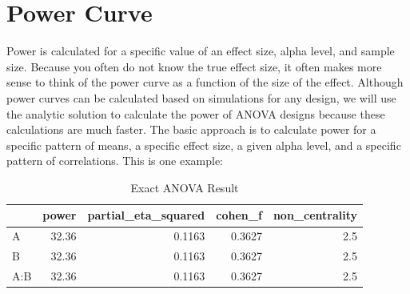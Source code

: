 \documentclass[]{book}
\newenvironment{Shaded}{\begin{snugshade}}{\end{snugshade}}
\newcommand{\CommentTok}[1]{\textcolor[rgb]{0.56,0.35,0.01}{\textit{#1}}}
\newcommand{\DataTypeTok}[1]{\textcolor[rgb]{0.13,0.29,0.53}{#1}}
\newcommand{\DecValTok}[1]{\textcolor[rgb]{0.00,0.00,0.81}{#1}}
\newcommand{\FloatTok}[1]{\textcolor[rgb]{0.00,0.00,0.81}{#1}}
\newcommand{\KeywordTok}[1]{\textcolor[rgb]{0.13,0.29,0.53}{\textbf{#1}}}
\newcommand{\NormalTok}[1]{#1}
\newcommand{\OtherTok}[1]{\textcolor[rgb]{0.56,0.35,0.01}{#1}}
\newcommand{\StringTok}[1]{\textcolor[rgb]{0.31,0.60,0.02}{#1}}
\begin{document}
\hypertarget{power-curve}{%
\chapter{Power Curve}\label{power-curve}}

Power is calculated for a specific value of an effect size, alpha level, and sample size. Because you often do not know the true effect size, it often makes more sense to think of the power curve as a function of the size of the effect. Although power curves can be calculated based on simulations for any design, we will use the analytic solution to calculate the power of ANOVA designs because these calculations are much faster. The basic approach is to calculate power for a specific pattern of means, a specific effect size, a given alpha level, and a specific pattern of correlations. This is one example:

\begin{Shaded}
\end{Shaded}

\begin{table}[t]

\caption{\label{tab:unnamed-chunk-265}Exact ANOVA Result}
\centering
\begin{tabular}{l|r|r|r|r}
\hline
  & power & partial\_eta\_squared & cohen\_f & non\_centrality\\
\hline
A & 32.36 & 0.1163 & 0.3627 & 2.5\\
\hline
B & 32.36 & 0.1163 & 0.3627 & 2.5\\
\hline
A:B & 32.36 & 0.1163 & 0.3627 & 2.5\\
\hline
\end{tabular}
\end{table}
\end{document}
